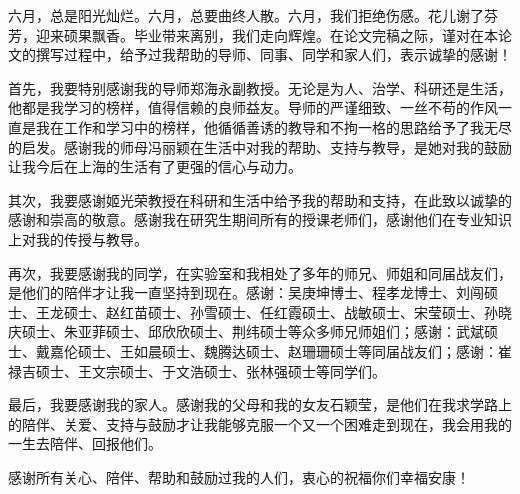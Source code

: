 \begin{acknowledgement}

  六月，总是阳光灿烂。六月，总要曲终人散。六月，我们拒绝伤感。花儿谢了芬芳，迎来硕果飘香。毕业带来离别，我们走向辉煌。在论文完稿之际，谨对在本论文的撰写过程中，给予过我帮助的导师、同事、同学和家人们，表示诚挚的感谢！
  
  首先，我要特别感谢我的导师郑海永副教授。无论是为人、治学、科研还是生活，他都是我学习的榜样，值得信赖的良师益友。导师的严谨细致、一丝不苟的作风一直是我在工作和学习中的榜样，他循循善诱的教导和不拘一格的思路给予了我无尽的启发。感谢我的师母冯丽颖在生活中对我的帮助、支持与教导，是她对我的鼓励让我今后在上海的生活有了更强的信心与动力。
  
  其次，我要感谢姬光荣教授在科研和生活中给予我的帮助和支持，在此致以诚挚的感谢和崇高的敬意。感谢我在研究生期间所有的授课老师们，感谢他们在专业知识上对我的传授与教导。
   
  再次，我要感谢我的同学，在实验室和我相处了多年的师兄、师姐和同届战友们，是他们的陪伴才让我一直坚持到现在。感谢：吴庚坤博士、程孝龙博士、刘闯硕士、王龙硕士、赵红苗硕士、孙雪硕士、任红霞硕士、战敏硕士、宋莹硕士、孙晓庆硕士、朱亚菲硕士、邱欣欣硕士、荆纬硕士等众多师兄师姐们；感谢：武斌硕士、戴嘉伦硕士、王如晨硕士、魏腾达硕士、赵珊珊硕士等同届战友们；感谢：崔禄吉硕士、王文宗硕士、于文浩硕士、张林强硕士等同学们。
  
  最后，我要感谢我的家人。感谢我的父母和我的女友石颖莹，是他们在我求学路上的陪伴、关爱、支持与鼓励才让我能够克服一个又一个困难走到现在，我会用我的一生去陪伴、回报他们。
  
  感谢所有关心、陪伴、帮助和鼓励过我的人们，衷心的祝福你们幸福安康！

\end{acknowledgement}
